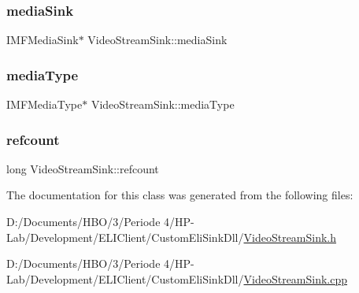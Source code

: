 \mbox{\label{class_video_stream_sink_a4e6518250328b3d6a9bc62d2e4cc7b78}} 
\subsubsection{\texorpdfstring{media\+Sink}{mediaSink}}
{\footnotesize\ttfamily I\+M\+F\+Media\+Sink$\ast$ Video\+Stream\+Sink\+::media\+Sink\hspace{0.3cm}{\ttfamily [private]}}

\mbox{\label{class_video_stream_sink_ad00911bc5c59dbff2ced165dcea71602}} 
\subsubsection{\texorpdfstring{media\+Type}{mediaType}}
{\footnotesize\ttfamily I\+M\+F\+Media\+Type$\ast$ Video\+Stream\+Sink\+::media\+Type\hspace{0.3cm}{\ttfamily [private]}}

\mbox{\label{class_video_stream_sink_a1973d447dfe2ecaad7e748bb294f95ce}} 
\subsubsection{\texorpdfstring{refcount}{refcount}}
{\footnotesize\ttfamily long Video\+Stream\+Sink\+::refcount\hspace{0.3cm}{\ttfamily [private]}}



The documentation for this class was generated from the following files\+:\begin{DoxyCompactItemize}
\item 
D\+:/\+Documents/\+H\+B\+O/3/\+Periode 4/\+H\+P-\/\+Lab/\+Development/\+E\+L\+I\+Client/\+Custom\+Eli\+Sink\+Dll/\hyperlink{_video_stream_sink_8h}{Video\+Stream\+Sink.\+h}\item 
D\+:/\+Documents/\+H\+B\+O/3/\+Periode 4/\+H\+P-\/\+Lab/\+Development/\+E\+L\+I\+Client/\+Custom\+Eli\+Sink\+Dll/\hyperlink{_video_stream_sink_8cpp}{Video\+Stream\+Sink.\+cpp}\end{DoxyCompactItemize}
